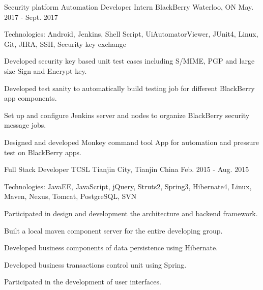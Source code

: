 \begin{cventries}
  \cventry
    {Security platform Automation Developer Intern}
    {BlackBerry}
    {Waterloo, ON}
    {May. 2017 - Sept. 2017}
    {
      \begin{cvitems}
        \item {Technologies: Android, Jenkins, Shell Script, UiAutomatorViewer, JUnit4, Linux, Git, JIRA, SSH, Security key exchange}
        \item {Developed security key based unit test cases including S/MIME, PGP and large size Sign and Encrypt key.}
        \item {Developed test sanity to automatically build testing job for different BlackBerry app components.}
        \item {Set up and configure Jenkins server and nodes to organize BlackBerry security message jobs.}
        \item {Designed and developed Monkey command tool App for automation and pressure test on BlackBerry apps.}
      \end{cvitems}
    }
  
    
  \cventry
    {Full Stack Developer}
    {TCSL}
    {Tianjin City, Tianjin China}
    {Feb. 2015 - Aug. 2015}
    {
      \begin{cvitems}
        \item {Technologies: JavaEE, JavaScript, jQuery, Struts2, Spring3, Hibernate4, Linux, Maven, Nexus, Tomcat, PostgreSQL, SVN}
        \item {Participated in design and development the architecture and backend framework.}
        \item {Built a local maven component server for the entire developing group.}
        \item {Developed business components of data persistence using Hibernate.}
        \item {Developed business transactions control unit using Spring.}
        \item {Participated in the development of user interfaces.}
      \end{cvitems}
    }
    

\end{cventries}
